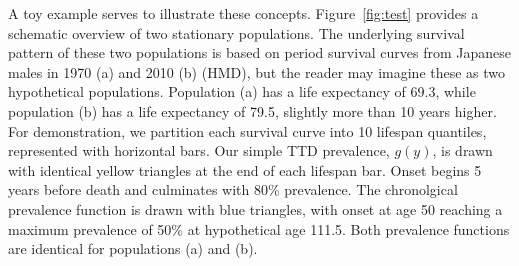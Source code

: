 \documentclass[11pt,oneside,a4paper]{article} %
\begin{document}
A toy example serves to illustrate these concepts. Figure~\ref{fig:test}
provides a schematic overview of two stationary populations. The
underlying survival pattern of these two populations is based on period survival
curves from Japanese males in 1970 (a) and 2010 (b) (HMD), but the reader may
imagine these as two hypothetical populations. Population (a) has a life
expectancy of 69.3, while population (b) has a life expectancy of 79.5, slightly
more than 10 years higher. For demonstration, we partition each survival curve
into 10 lifespan quantiles, represented with horizontal bars. Our simple
TTD prevalence, $g(y)$, is drawn with identical yellow triangles at
the end of each lifespan bar. Onset begins 5 years before death and culminates with 80\%
prevalence. The chronolgical prevalence function is drawn with blue triangles,
with onset at age 50 reaching a maximum prevalence of 50\% at hypothetical age
111.5. Both prevalence functions are identical for populations (a) and (b). 
\end{document}
